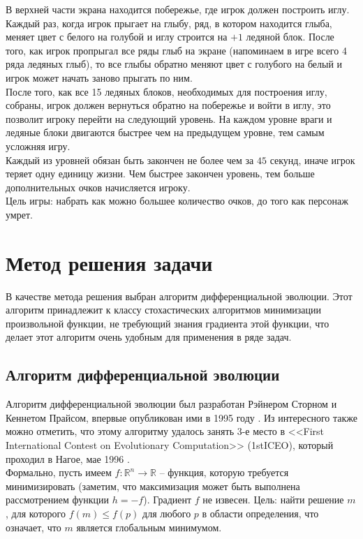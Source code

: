 \documentclass[12pt]{article}
\begin{document}
    В верхней части экрана находится побережье, где игрок должен построить иглу. Каждый раз, когда игрок прыгает на глыбу, ряд, в котором находится глыба, меняет цвет с белого на голубой и иглу строится на $+1$ ледяной блок. После того, как игрок пропрыгал все ряды глыб на экране (напоминаем в игре всего 4 ряда ледяных глыб), то все глыбы обратно меняют цвет с голубого на белый и игрок может начать заново прыгать по ним. \\

    После того, как все 15 ледяных блоков, необходимых для построения иглу, собраны, игрок должен вернуться обратно на побережье и войти в иглу, это позволит игроку перейти на следующий уровень. На каждом уровне враги и ледяные блоки двигаются быстрее чем на предыдущем уровне, тем самым усложняя игру. \\

    Каждый из уровней обязан быть закончен не более чем за $45$ секунд, иначе игрок теряет одну единицу жизни. Чем быстрее закончен уровень, тем больше дополнительных очков начисляется игроку. \\

    Цель игры: набрать как можно большее количество очков, до того как персонаж умрет.

\section{Метод решения задачи}
    В качестве метода решения выбран алгоритм дифференциальной эволюции. Этот алгоритм принадлежит к классу стохастических алгоритмов минимизации произвольной функции, не требующий знания градиента этой функции, что делает этот алгоритм очень удобным для применения в ряде задач.

    \subsection{Алгоритм дифференциальной эволюции}
        Алгоритм дифференциальной эволюции был разработан Рэйнером Сторном и Кеннетом Прайсом, впервые опубликован ими в 1995 году \cite{DE-1995}. Из интересного также можно отметить, что этому алгоритму удалось занять 3-е место в <<First International Contest on Evolutionary Computation>> (1stICEO), который проходил в Нагое, мае 1996 \cite{DE}. \\

        Формально, пусть имеем $f: \mathbb{R}^{n} \to \mathbb{R}$ -- функция, которую требуется минимизировать (заметим, что максимизация может быть выполнена рассмотрением функции $h = -f$). Градиент $f$ не извесен. Цель: найти решение $m$, для которого $f(m) \leq f(p)$ для любого $p$ в области определения, что означает, что $m$ является глобальным минимумом. \\
\end{document}
